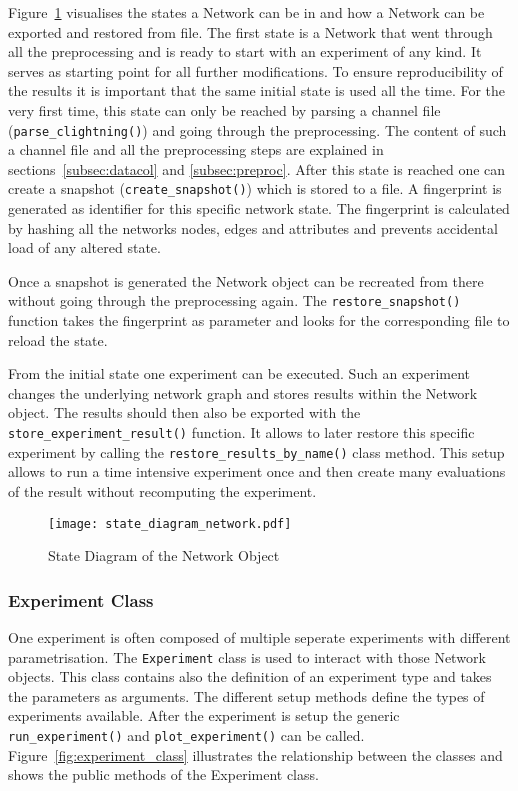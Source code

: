 \documentclass[final]{fhnwreport}       %
\begin{document}
Figure~\ref{fig:state_network} visualises the states a Network can be in and how a Network can be exported and restored from file. The first state is a Network that went through all the preprocessing and is ready to start with an experiment of any kind. It serves as starting point for all further modifications. To ensure reproducibility of the results it is important that the same initial state is used all the time. For the very first time, this state can only be reached by parsing a channel file (\texttt{parse_clightning()}) and going through the preprocessing. The content of such a channel file and all the preprocessing steps are explained in sections~\ref{subsec:datacol} and \ref{subsec:preproc}. After this state is reached one can create a snapshot (\texttt{create_snapshot()}) which is stored to a file. A fingerprint is generated as identifier for this specific network state. The fingerprint is calculated by hashing all the networks nodes, edges and attributes and prevents accidental load of any altered state.

Once a snapshot is generated the Network object can be recreated from there without going through the preprocessing again. The \texttt{restore_snapshot()} function takes the fingerprint as parameter and looks for the corresponding file to reload the state. 

From the initial state one experiment can be executed. Such an experiment changes the underlying network graph and stores results within the Network object. The results should then also be exported with the \texttt{store_experiment_result()} function. It allows to later restore this specific experiment by calling the \texttt{restore_results_by_name()} class method. This setup allows to run a time intensive experiment once and then create many evaluations of the result without recomputing the experiment. 

\begin{figure}[H]
\centering
\texttt{[image: state\_diagram\_network.pdf]}
\caption{State Diagram of the Network Object}
\label{fig:state_network}
\end{figure}

\subsubsection{Experiment Class}
One experiment is often composed of multiple seperate experiments with different parametrisation. The \texttt{Experiment} class is used to interact with those Network objects. This class contains also the definition of an experiment type and takes the parameters as arguments. The different setup methods define the types of experiments available. After the experiment is setup the generic \texttt{run_experiment()} and \texttt{plot_experiment()} can be called. Figure~\ref{fig:experiment_class} illustrates the relationship between the classes and shows the public methods of the Experiment class.
\end{document}

